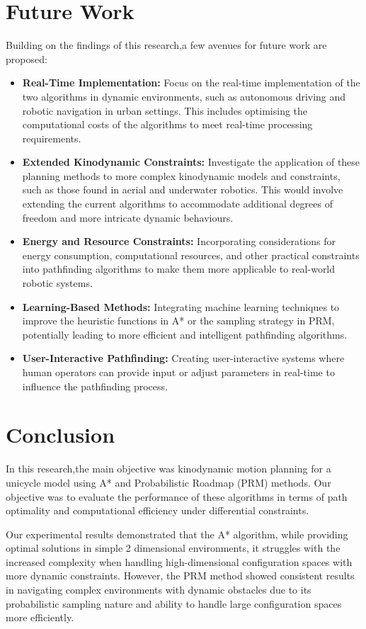 \documentclass[9pt,a4paper,twoside]{rho-class/rho}
\begin{document}
\section{Future Work}
Building on the findings of this research,a few avenues for future work are proposed:
\begin{itemize}
    \item \textbf{Real-Time Implementation:} Focus on the real-time implementation of the two algorithms in dynamic environments, such as autonomous driving and robotic navigation in urban settings. This includes optimising the computational costs of the algorithms to meet real-time processing requirements.
    \item \textbf{Extended Kinodynamic Constraints:} Investigate the application of these planning methods to more complex kinodynamic models and constraints, such as those found in aerial and underwater robotics. This would involve extending the current algorithms to accommodate additional degrees of freedom and more intricate dynamic behaviours.
    \item \textbf{Energy and Resource Constraints:} Incorporating considerations for energy consumption, computational resources, and other practical constraints into pathfinding algorithms to make them more applicable to real-world robotic systems.
    \item \textbf{Learning-Based Methods:} Integrating machine learning techniques to improve the heuristic functions in A* or the sampling strategy in PRM, potentially leading to more efficient and intelligent pathfinding algorithms.
    \item \textbf{User-Interactive Pathfinding:} Creating user-interactive systems where human operators can provide input or adjust parameters in real-time to influence the pathfinding process.
\end{itemize}

\section{Conclusion}
In this research,the main objective was kinodynamic motion planning for a unicycle model using A* and Probabilistic Roadmap (PRM) methods. Our objective was to evaluate the performance of these algorithms in terms of path optimality and computational efficiency under differential constraints.

Our experimental results demonstrated that the A* algorithm, while providing optimal solutions in simple 2 dimensional environments, it struggles with the increased complexity when handling high-dimensional configuration spaces with more dynamic constraints. However, the PRM method showed consistent results in navigating complex environments with dynamic obstacles due to its probabilistic sampling nature and ability to handle large configuration spaces more efficiently.
\end{document}
